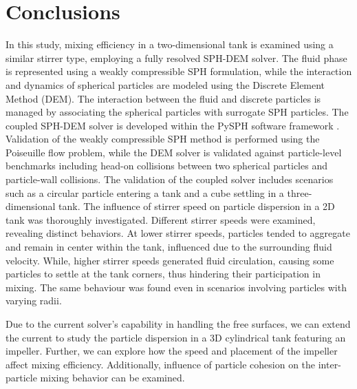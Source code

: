 \documentclass[preprint,12pt]{elsarticle}
\begin{document}



\FloatBarrier%
\section{Conclusions}
\label{sec:conclusions}
In this study, mixing efficiency in a two-dimensional tank is examined using a
similar stirrer type, employing a fully resolved SPH-DEM solver. The fluid
phase is represented using a weakly compressible SPH formulation, while the
interaction and dynamics of spherical particles are modeled using the Discrete
Element Method (DEM). The interaction between the fluid and discrete particles
is managed by associating the spherical particles with surrogate SPH
particles. The coupled SPH-DEM solver is developed within the PySPH software
framework \cite{ramachandran2021pysph}. Validation of the weakly compressible
SPH method is performed using the Poiseuille flow problem, while the DEM
solver is validated against particle-level benchmarks including head-on
collisions between two spherical particles and particle-wall collisions. The
validation of the coupled solver includes scenarios such as a circular
particle entering a tank and a cube settling in a three-dimensional tank.  The
influence of stirrer speed on particle dispersion in a 2D tank was thoroughly
investigated. Different stirrer speeds were examined, revealing distinct
behaviors. At lower stirrer speeds, particles tended to aggregate and remain
in center within the tank, influenced due to the surrounding fluid
velocity. While, higher stirrer speeds generated fluid circulation, causing
some particles to settle at the tank corners, thus hindering their
participation in mixing. The same behaviour was found even in scenarios involving
particles with varying radii.


Due to the current solver's capability in handling the free surfaces, we can
extend the current to study the particle dispersion in a 3D cylindrical tank
featuring an impeller. Further, we can explore how the speed and placement of
the impeller affect mixing efficiency. Additionally, influence of particle
cohesion on the inter-particle mixing behavior can be examined.





\end{document}
